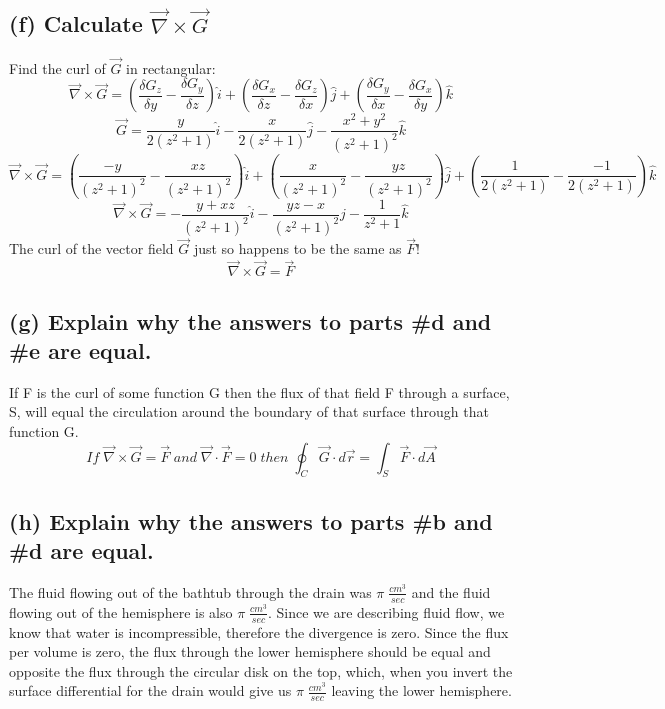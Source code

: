 \documentclass[11pt]{article}
\begin{document}
\subsection*{(f) Calculate $\vec{\nabla} \times \vec{G}$}
Find the curl of $\vec{G}$ in rectangular: 
$$\vec{\nabla} \times \vec{G} = \left(\frac{\delta G_z}{\delta y} - \frac{\delta G_y}{\delta z}\right)\hat{i} + \left(\frac{\delta G_x}{\delta z} - \frac{\delta G_z}{\delta x}\right)\hat{j} + \left(\frac{\delta G_y}{\delta x} - \frac{\delta G_x}{\delta y}\right)\hat{k}$$
$$\vec{G} = \frac{y}{2(z^2+1)}\hat{i} - \frac{x}{2(z^2+1)}\hat{j} - \frac{x^2+y^2}{(z^2+1)^2}\hat{k}$$
$$\vec{\nabla} \times \vec{G} = \left(\frac{-y}{(z^2+1)^2} - \frac{xz}{(z^2+1)^2}\right) \hat{i} + \left(\frac{x}{(z^2+1)^2} - \frac{yz}{(z^2+1)^2}\right) \hat{j} + \left(\frac{1}{2(z^2+1)} - \frac{-1}{2(z^2+1)}\right) \hat{k}$$
$$\vec{\nabla} \times \vec{G} = -\frac{y+xz}{(z^2+1)^2}\hat{i}-\frac{yz-x}{(z^2+1)^2}\hat{j}-\frac{1}{z^2+1}\hat{k}$$
The curl of the vector field $\vec{G}$ just so happens to be the same as $\vec{F}$!
$$\vec{\nabla} \times \vec{G} = \vec{F}$$

\subsection*{(g) Explain why the answers to parts \#d and \#e are equal.}
If F is the curl of some function G then the flux of that field F through a surface, S, will equal the circulation around the boundary of that surface through that function G.
$$If\;\vec{\nabla} \times \vec{G} = \vec{F} \;and\; \vec{\nabla}\cdot \vec{F} = 0 \;then\; \oint_C \vec{G}\cdot d\vec{r} = \int_S \vec{F} \cdot d\vec{A}$$
\subsection*{(h) Explain why the answers to parts \#b and \#d are equal.}
The fluid flowing out of the bathtub through the drain was $\pi\;\frac{cm^3}{sec}$ and the fluid flowing out of the hemisphere is also $\pi\;\frac{cm^3}{sec}$. Since we are describing fluid flow, we know that water is incompressible, therefore the divergence is zero. Since the flux per volume is zero, the flux through the lower hemisphere should be equal and opposite the flux through the circular disk on the top, which, when you invert the surface differential for the drain would give us $\pi\;\frac{cm^3}{sec}$ leaving the lower hemisphere. 
\end{document}
